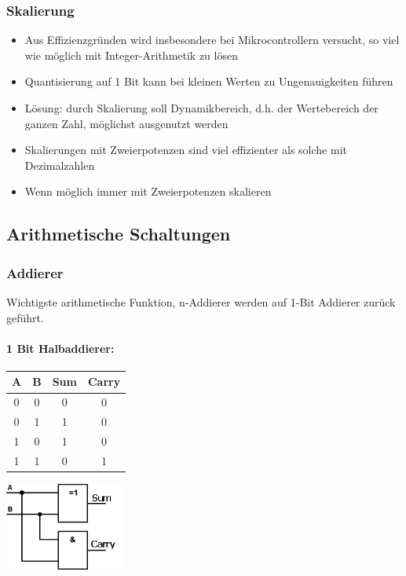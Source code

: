 \subsubsection{Skalierung}
\begin{itemize}
	\item Aus Effizienzgründen wird insbesondere bei Mikrocontrollern versucht, so viel wie möglich mit Integer-Arithmetik zu lösen
	\item Quantisierung auf 1 Bit kann bei kleinen Werten zu Ungenauigkeiten führen
	\item Lösung: durch Skalierung soll Dynamikbereich, d.h. der Wertebereich der ganzen Zahl, möglichst ausgenutzt werden
	\item Skalierungen mit Zweierpotenzen sind viel effizienter als solche mit Dezimalzahlen
	\item Wenn möglich immer mit Zweierpotenzen skalieren	
\end{itemize}

\subsection{Arithmetische Schaltungen}
\subsubsection{Addierer}
Wichtigste arithmetische Funktion, n-Addierer werden auf 1-Bit Addierer zurück geführt.
\paragraph{1 Bit Halbaddierer:}
\begin{minipage}{0.5\textwidth}
	\centering
	\begin{tabular}{|c | c | c | c |}
		\hline
		A & B & Sum & Carry\\
		\hline
		0 & 0 & 0 & 0\\
		\hline
		0 & 1 & 1 & 0\\
		\hline
		1 & 0 & 1 & 0\\
		\hline
		1 & 1 & 0 & 1\\
		\hline
	\end{tabular}
\end{minipage}
\begin{minipage}{0.9\textwidth}
	\centering
	\begin{flushleft}
		{\includegraphics[width=0.3\textwidth]{images/Arithmetik/halbaddierer.png}}
	\end{flushleft}
\end{minipage}\\ \\

